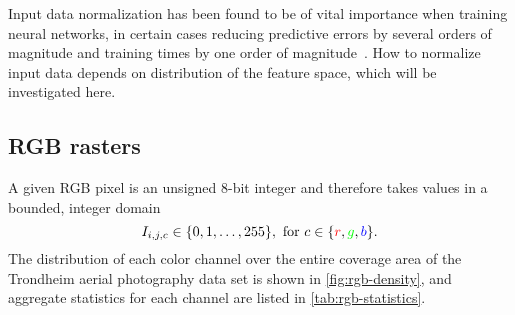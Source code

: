 Input data normalization has been found to be of vital importance when training neural networks, in certain cases reducing predictive errors by several orders of magnitude and training times by one order of magnitude~\cite{input_normalization_1997}.
How to normalize input data depends on distribution of the feature space, which will be investigated here.

\subsection{RGB rasters}

A given RGB pixel is an unsigned 8-bit integer and therefore takes values in a bounded, integer domain
%
\begin{equation*}
  I_{i,j,c} \in \{0, 1, \ldots, 255\}, \text{ for } c \in \{\textcolor{red}{r}, \textcolor{green}{g}, \textcolor{blue}{b}\}.
\end{equation*}
%
The distribution of each color channel over the entire coverage area of the Trondheim aerial photography data set is shown in \cref{fig:rgb-density}, and aggregate statistics for each channel are listed in \cref{tab:rgb-statistics}.

\begin{figure}[H]
  \begin{floatrow}
    \hspace{-2.5em}
  \end{floatrow}
\end{figure}

